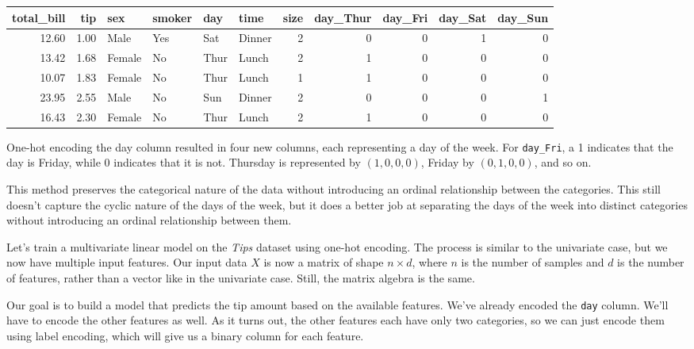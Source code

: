 

\begin{table}[ht]
    \centering 
    \begin{tabular}{rrllllrrrrr}
        \toprule
        total\_bill & tip & sex & smoker & day & time & size & day\_Thur & day\_Fri & day\_Sat & day\_Sun \\
        \midrule
        12.60 & 1.00 & Male & Yes & Sat & Dinner & 2 & 0 & 0 & 1 & 0 \\
        13.42 & 1.68 & Female & No & Thur & Lunch & 2 & 1 & 0 & 0 & 0 \\
        10.07 & 1.83 & Female & No & Thur & Lunch & 1 & 1 & 0 & 0 & 0 \\
        23.95 & 2.55 & Male & No & Sun & Dinner & 2 & 0 & 0 & 0 & 1 \\
        16.43 & 2.30 & Female & No & Thur & Lunch & 2 & 1 & 0 & 0 & 0 \\
        \bottomrule
        \end{tabular}
\end{table}    

One-hot encoding the day column resulted in four new columns, each representing a day of the week. For \texttt{day\_Fri}, a 1 indicates that the day is Friday, while 0 indicates that it is not. Thursday is represented by $(1,0,0,0)$, Friday by $(0,1,0,0)$, and so on.

This method preserves the categorical nature of the data without introducing an ordinal relationship between the categories. This still doesn't capture the cyclic nature of the days of the week, but it does a better job at separating the days of the week into distinct categories without introducing an ordinal relationship between them.

Let's train a multivariate linear model on the \emph{Tips} dataset using one-hot encoding. The process is similar to the univariate case, but we now have multiple input features. Our input data $X$ is now a matrix of shape $n\times d$, where $n$ is the number of samples and $d$ is the number of features, rather than a vector like in the univariate case. Still, the matrix algebra is the same. 

Our goal is to build a model that predicts the tip amount based on the available features. We've already encoded the \texttt{day} column. We'll have to encode the other features as well. As it turns out, the other features each have only two categories, so we can just encode them using label encoding, which will give us a binary column for each feature.

